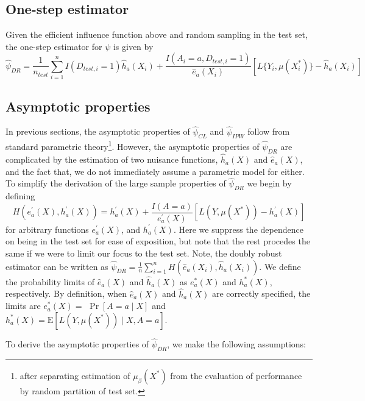 \subsection{One-step estimator}
Given the efficient influence function above and  random sampling in the test set, the one-step estimator for $\psi$ is given by
\begin{equation*}
    \widehat{\psi}_{DR} = \frac{1}{n_{test}}\sum_{i=1}^n I(D_{test, i} = 1)\widehat{h}_a(X_i) + \frac{I(A_i = a, D_{test, i} = 1)}{\widehat{e}_a(X_i)} \left[ L\{Y_i, \mu(X^*_i)\} - \widehat{h}_a(X_i)\right]
\end{equation*}

\subsection{Asymptotic properties}
In previous sections, the asymptotic properties of $\widehat{\psi}_{CL}$ and $\widehat{\psi}_{IPW}$ follow from standard parametric theory\footnote{after separating estimation of $\mu_\beta(X^*)$ from the evaluation of performance by random partition of test set.}. However, the asymptotic properties of $\widehat{\psi}_{DR}$ are complicated by the estimation of two nuisance functions, $\widehat{h}_a(X)$ and $\widehat{e}_a(X)$, and the fact that, we do not immediately assume a parametric model for either. To simplify the derivation of the large sample properties of $\widehat{\psi}_{DR}$ we begin by defining
$$
H\left(e_a^{\prime}(X), h_a^{\prime}(X)\right)=h_a^{\prime}(X)+\frac{I(A = a)}{e_a^{\prime}(X)}\left[L\left(Y, \mu\left(X^*\right)\right)-h_a^{\prime}(X)\right]
$$
for arbitrary functions $e_a^{\prime}(X)$, and $h_a^{\prime}(X)$. Here we suppress the dependence on being in the test set for ease of exposition, but note that the rest procedes the same if we were to limit our focus to the test set. Note, the doubly robust estimator can be written as $\widehat{\psi}_{DR}=\frac{1}{n} \sum_{i=1}^n H\left(\widehat{e}_a\left(X_i\right), \widehat{h}_a\left(X_i\right)\right)$. We define the probability limits of $\widehat{e}_a(X)$ and $\widehat{h}_a(X)$ as $e_a^*(X)$ and $h_a^*(X)$, respectively. By definition, when $\widehat{e}_a(X)$ and $\widehat{h}_a(X)$ are correctly specified, the limits are  $e_a^*(X)=$ $\operatorname{Pr}[A=a \mid X]$ and $h^*_a(X)=\mathrm{E}\left[L\left(Y, \mu\left(X^*\right)\right) \mid X, A=a\right]$.

To derive the asymptotic properties of $\widehat{\psi}_{DR}$, we make the following assumptions:

